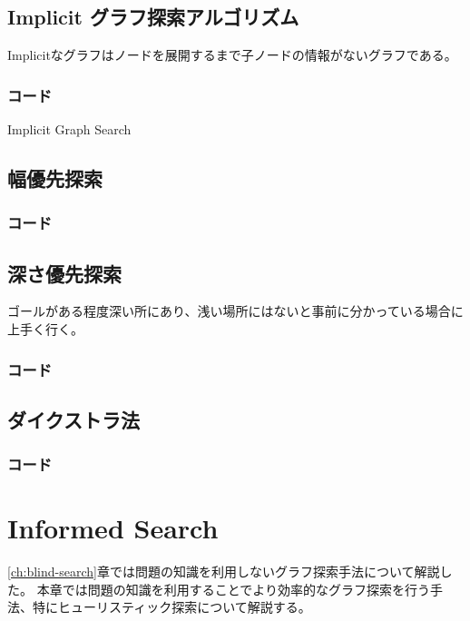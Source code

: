 \documentclass{book}
\begin{document}
\section{Implicit グラフ探索アルゴリズム}

Implicitなグラフはノードを展開するまで子ノードの情報がないグラフである。

\subsection{コード}

\begin{algorithm}
\caption{Implicit Graph Search}
\label{alg:implicit-graph-search}

	
\end{algorithm}

\section{幅優先探索}


\subsection{コード}

\section{深さ優先探索}
ゴールがある程度深い所にあり、浅い場所にはないと事前に分かっている場合に上手く行く。

\subsection{コード}

\section{ダイクストラ法}

\subsection{コード}


\chapter{Informed Search}
\ref{ch:blind-search}章では問題の知識を利用しないグラフ探索手法について解説した。
本章では問題の知識を利用することでより効率的なグラフ探索を行う手法、特にヒューリスティック探索について解説する。
\end{document}
